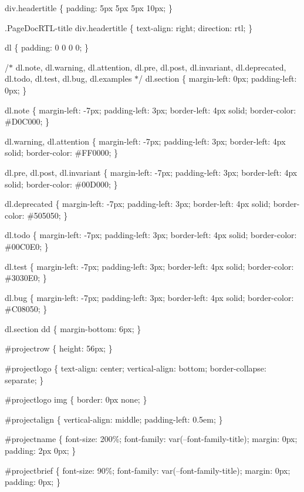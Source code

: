 div.\+headertitle \{ padding\+: 5px 5px 5px 10px; \}

.Page\+Doc\+RTL-\/title div.\+headertitle \{ text-\/align\+: right; direction\+: rtl; \}

dl \{ padding\+: 0 0 0 0; \}

/\texorpdfstring{$\ast$}{*} dl.\+note, dl.\+warning, dl.\+attention, dl.\+pre, dl.\+post, dl.\+invariant, dl.\+deprecated, dl.\+todo, dl.\+test, dl.\+bug, dl.\+examples \texorpdfstring{$\ast$}{*}/ dl.\+section \{ margin-\/left\+: 0px; padding-\/left\+: 0px; \}

dl.\+note \{ margin-\/left\+: -\/7px; padding-\/left\+: 3px; border-\/left\+: 4px solid; border-\/color\+: \#\+D0\+C000; \}

dl.\+warning, dl.\+attention \{ margin-\/left\+: -\/7px; padding-\/left\+: 3px; border-\/left\+: 4px solid; border-\/color\+: \#\+FF0000; \}

dl.\+pre, dl.\+post, dl.\+invariant \{ margin-\/left\+: -\/7px; padding-\/left\+: 3px; border-\/left\+: 4px solid; border-\/color\+: \#00D000; \}

dl.\+deprecated \{ margin-\/left\+: -\/7px; padding-\/left\+: 3px; border-\/left\+: 4px solid; border-\/color\+: \#505050; \}

dl.\+todo \{ margin-\/left\+: -\/7px; padding-\/left\+: 3px; border-\/left\+: 4px solid; border-\/color\+: \#00C0\+E0; \}

dl.\+test \{ margin-\/left\+: -\/7px; padding-\/left\+: 3px; border-\/left\+: 4px solid; border-\/color\+: \#3030E0; \}

dl.\+bug \{ margin-\/left\+: -\/7px; padding-\/left\+: 3px; border-\/left\+: 4px solid; border-\/color\+: \#\+C08050; \}

dl.\+section dd \{ margin-\/bottom\+: 6px; \}

\#projectrow \{ height\+: 56px; \}

\#projectlogo \{ text-\/align\+: center; vertical-\/align\+: bottom; border-\/collapse\+: separate; \}

\#projectlogo img \{ border\+: 0px none; \}

\#projectalign \{ vertical-\/align\+: middle; padding-\/left\+: 0.\+5em; \}

\#projectname \{ font-\/size\+: 200\%; font-\/family\+: var(--font-\/family-\/title); margin\+: 0px; padding\+: 2px 0px; \}

\#projectbrief \{ font-\/size\+: 90\%; font-\/family\+: var(--font-\/family-\/title); margin\+: 0px; padding\+: 0px; \}

